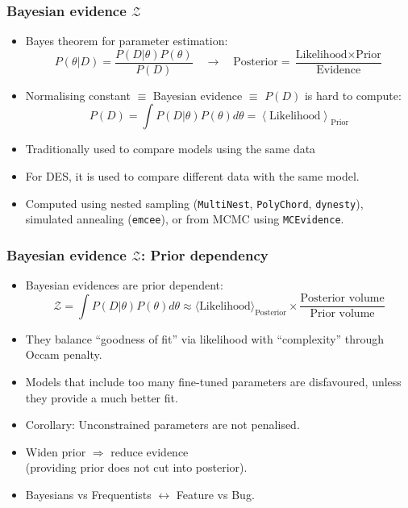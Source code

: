 \documentclass[aspectratio=169, handout]{beamer}
\begin{document}
\begin{frame}
    \frametitle{Bayesian evidence $\mathcal{Z}$}
    \begin{itemize}
        \item Bayes theorem for parameter estimation:
    \[
    P(\theta|D) = \frac{P(D|\theta)P(\theta)}{P(D)} \quad\longrightarrow\quad \text{Posterior} = \frac{\text{Likelihood}\times\text{Prior}}{\text{Evidence}}
    \]
        \item Normalising constant $\equiv$ Bayesian evidence $\equiv$ $P(D)$ is hard to compute:
    \[
        P(D) = \int P(D|\theta)P(\theta) d\theta = \left\langle \text{Likelihood} \right\rangle_\text{Prior}
    \]
        \item Traditionally used to compare models using the same data
        \item For DES, it is used to compare different data with the same model.
        \item Computed using nested sampling (\texttt{MultiNest}, \texttt{PolyChord}, \texttt{dynesty}), simulated annealing (\texttt{emcee}), or from MCMC using \texttt{MCEvidence}.
    \end{itemize}
\end{frame}

\begin{frame}
    \frametitle{Bayesian evidence $\mathcal{Z}$: Prior dependency}
    \begin{itemize}
        \item Bayesian evidences are prior dependent:
            \[
                \mathcal{Z} = \int P(D|\theta)P(\theta) d\theta \approx \langle\text{Likelihood}\rangle_\text{Posterior} \times \frac{\text{Posterior volume}}{\text{Prior volume}}
            \]
        \item They balance ``goodness of fit'' via likelihood with ``complexity'' through Occam penalty.
        \item Models that include too many fine-tuned parameters are disfavoured, unless they provide a much better fit.
        \item Corollary: Unconstrained parameters are not penalised.
        \item Widen prior $\Rightarrow$ reduce evidence \\ (providing prior does not cut into posterior).
        \item Bayesians vs Frequentists $\leftrightarrow$ Feature vs Bug.
    \end{itemize}
\end{frame}
\end{document}
